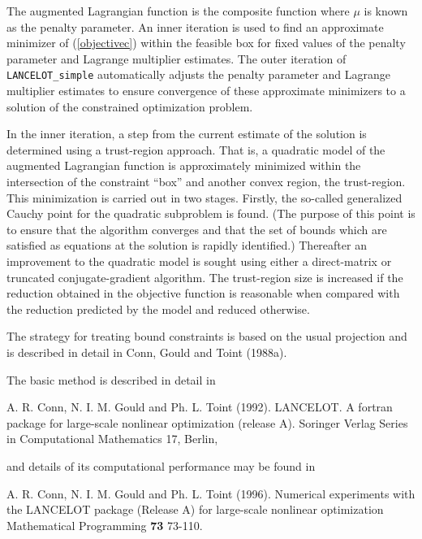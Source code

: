 \documentclass{galahad}
\newcommand{\packagename}{LANCELOT\_simple}
\newcommand{\calC}{{\cal C}}
\begin{document}
The augmented Lagrangian function is the composite function
\eqn{objectivec}{\phi( \bmx, \bmy, \mu ) = \ell( \bmx, \bmy) +
 \frac{1}{2 \mu} \sum_{i \in \calC} [c_i (\bmx)]^2,}
where $\mu$ is known as the penalty parameter.  An inner iteration is
used to find an approximate minimizer of (\ref{objectivec}) within the
feasible box for fixed values of the penalty parameter and Lagrange
multiplier estimates. The outer iteration of {\tt \packagename}
automatically adjusts the penalty parameter and Lagrange multiplier
estimates to ensure convergence of these approximate minimizers to a
solution of the constrained optimization problem.

In the inner iteration, a step from the current estimate of the solution
is determined using a trust-region approach.  That is, a quadratic model
of the augmented Lagrangian function is approximately minimized within
the intersection of the constraint ``box'' and another convex region,
the trust-region.  This minimization is carried out in two stages.
Firstly, the so-called generalized Cauchy point for the quadratic
subproblem is found.  (The purpose of this point is to ensure that the
algorithm converges and that the set of bounds which are satisfied as
equations at the solution is rapidly identified.)  Thereafter an
improvement to the quadratic model is sought using either a
direct-matrix or truncated conjugate-gradient algorithm. The
trust-region size is increased if the reduction obtained in the
objective function is reasonable when compared with the reduction
predicted by the model and reduced otherwise.

The strategy for treating bound constraints is based on the usual
projection and is described in detail in Conn, Gould and Toint (1988a).

\galreferences
\vspace*{1mm}

\noindent
The basic method is described in detail in 
\vspace*{1mm}

\noindent
A. R. Conn, N. I. M. Gould and Ph. L. Toint (1992).
LANCELOT. A fortran package for large-scale nonlinear optimization
(release A). Soringer Verlag Series in Computational Mathematics 17,
Berlin,

\noindent
and details of its computational performance may be found in

\noindent
A. R. Conn, N. I. M. Gould and Ph. L. Toint (1996).
Numerical experiments with the {\sf LANCELOT} package
(Release A) for large-scale nonlinear optimization
Mathematical Programming {\bf 73} 73-110.
\end{document}
